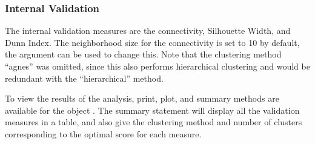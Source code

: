 \documentclass[11pt]{article}
\begin{document}
\subsubsection*{Internal Validation}

The internal validation measures are the connectivity, Silhouette Width, and
Dunn Index.   The neighborhood size for the connectivity is
set to 10 by default, the  argument can be used to change
this.  Note that the clustering method ``agnes'' was omitted, since
this also performs hierarchical clustering and would be redundant with
the ``hierarchical'' method.  

\begin{Schunk}
\end{Schunk}

To view the results of the analysis, print, plot, and summary methods
are available for the  object .  The summary
statement will display all the validation measures in a table, and
also give the clustering method and number of clusters corresponding
to the optimal score for each measure.
\end{document}
